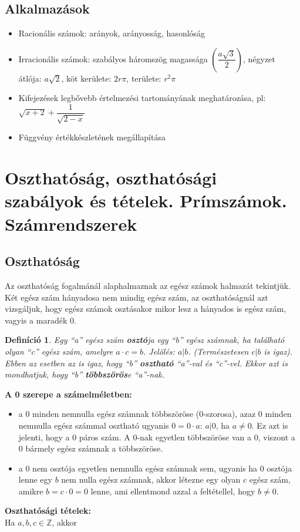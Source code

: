 \documentclass[12pt,a4paper]{article}
\newtheorem{definition}{Definíció} [section]
\begin{document}
\subsection{Alkalmazások}
\begin{itemize}
\item Racionális számok: arányok, arányosság, hasonlóság
\item Irracionális számok: szabályos háromszög magassága $\left(\dfrac{a\sqrt{3}}{2} \right)$, négyzet átlója: $a\sqrt{2}$, köt kerülete: $2r\pi$, területe: $r^2\pi$
\item Kifejezések legbővebb értelmezési tartományának meghatározása, pl: $\sqrt{x+2}+\dfrac{1}{\sqrt{2-x}}$
\item Függvény értékkészletének megállapítása
\end{itemize}
\newpage


\section{Oszthatóság, oszthatósági szabályok és tételek. Prímszámok. Számrendszerek}
\subsection{Oszthatóság}
Az oszthatóság fogalmánál alaphalmaznak az egész számok halmazát tekintjük. Két egész szám hányadosa nem mindig egész szám, az oszthatóságnál azt vizsgáljuk, hogy egész számok osztásakor mikor lesz a hányados is egész szám, vagyis a maradék 0.

\begin{definition}
Egy ``a'' egész szám \textbf{osztó}ja egy ``b'' egész számnak, ha található olyan ``c'' egész szám, amelyre $a \cdot c = b$. Jelölés: $a|b$. (Természetesen $c|b$ is igaz). Ebben az esetben az is igaz, hogy ``b'' \textbf{osztható} ``a''-val és ``c''-vel. Ekkor azt is mondhatjuk, hogy ``b'' \textbf{többszörös}e ``a''-nak.
\end{definition}
\textbf{A 0 szerepe a számelméletben:}
\begin{itemize}
\item a 0 minden nemnulla egész számnak többszöröse (0-szorosa), azaz 0 minden nemnulla egész számmal osztható ugyanis $0 = 0 \cdot a$: $a | 0$, ha $a \neq 0$. Ez azt is jelenti, hogy a 0 páros szám. A 0-nak egyetlen többszöröse van a 0, viszont a 0 bármely egész számnak a többszöröse.
\item  a 0 nem osztója egyetlen nemnulla egész számnak sem, ugyanis ha 0 osztója lenne egy $b$ nem nulla egész számnak, akkor létezne egy olyan $c$ egész szám, amikre $b = c \cdot 0 = 0$ lenne, ami ellentmond azzal a feltétellel, hogy $b \neq 0$.
\end{itemize}
\textbf{Oszthatósági tételek:} \\
Ha $a, b, c \in \mathbb{Z}$, akkor
\end{document}
